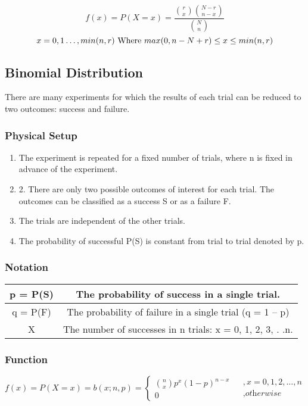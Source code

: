 \documentclass{article}
\begin{document}
$$ f(x) = P(X = x) = \frac{{r \choose x} {N-r \choose n-x }}{{N 
\choose n}} $$
$$x = 0, 1 \ldots , min(n,r) \\ \text{ Where  } max(0, n-N +r) \leq x \leq min(n, r) $$

\subsection{Binomial Distribution}
 There are many experiments for which the results of each trial
can be reduced to two outcomes: success and failure.

\subsubsection{Physical Setup}
\begin{enumerate}
\item The experiment is repeated for a fixed number of trials, where
n is fixed in advance of the experiment.
\item 2. There are only two possible outcomes of interest for each
trial. The outcomes can be classified as a success S or as a
failure F.
\item The trials are independent of the other trials.
\item The probability of successful P(S) is constant from trial to
trial denoted by p.
\end{enumerate}

\subsubsection{Notation}
\begin{center}
\begin{tabular}{|c|c|}
\hline 
p = P(S) & The probability of success in a single trial. \\ 
\hline 
q = P(F) & The probability of failure in a single trial
(q = 1 – p) \\ 
\hline 
X & The number of successes in n trials:
x = 0, 1, 2, 3, . .n. \\ 
\hline 
\end{tabular} 
\end{center}

\subsubsection{Function}
$$ f(x) = P(X = x) = b (x; n, p) = \begin{cases} {n \choose x} p^x (1-p)^{n-x} \\ 0 \end{cases} \begin{matrix}
&, x = 0, 1, 2,\ldots, n \\ &, \textit{otherwise} \end{matrix} $$
\end{document}
